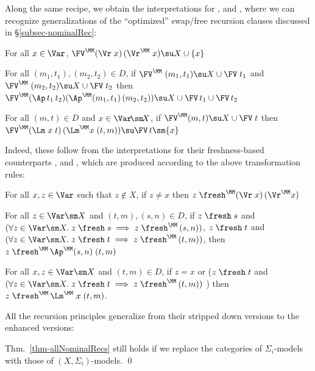 Along the same recipe, we obtain the interpretations for \FvVr{}, \FvAp{} and \FvLm{}, where we can recognize generalizations of the ``optimized'' swap/free recursion clauses discussed in  \S\ref{subsec-nominalRec}:
\begin{mmyitem}
\item  For all $x\in \Var$, 
$\FV^\MM(\Vr\;x)\,(\Vr^\MM\;x) \su X \cup \{x\}$
%
\item For all $(m_1,t_1),(m_2,t_2) \in D$, 
if $\FV^\MM\;(m_1,t_1) \su X \cup \FV\;t_1$ and $\FV^\MM\;(m_2,t_2) \su X \cup \FV\;t_2$ 
then 
\\
\hspace*{-2ex}$\FV^\MM(\Ap\,t_1\,t_2)(\Ap^\MM(m_1,t_1)\,(m_2,t_2)) \su X \cup \FV\,t_1 \cup \FV\,t_2$   

\item For all $(m,t)\in D$ and $x \in  \Var \!\sm\! X$, 
if $\FV^\MM(m,t) \su X \cup \FV\;t$ 
then 
$\FV^\MM(\Lm\;x\;t)\,(\Lm^\MM x\;(t,m)) \su \FV\,t \sm \{x\}$ 
\end{mmyitem}

Indeed, these follow from the interpretations for their freshness-based counterparts 
\FrVr{}, \FrAp{} and \FrLm{}, which are produced according to the above transformation rules:
\begin{mmyitem} 
\item For all $x,z\in\Var$ such that $z\notin X$, 
 if $z \not=x$ then $z\;\fresh^\MM(\Vr\;x)\,(\Vr^\MM x)$
%
\item For all $z\in\Var \sm X$ and $(t,m),(s,n) \in D$, 
if $z\;\fresh\;s$ and $(\forall z\in \Var \sm X.\; z\;\fresh\;s \implies z\;\fresh^\MM\,(s,n))$, 
$z\;\fresh\;t$ and $(\forall z\in \Var \sm X.\; z\;\fresh\;t \implies z\;\fresh^\MM\,(t,m))$, 
then 
$z\;\fresh^\MM\,\Ap^\MM(s,n)\;(t,m)$
%
\item For all $x,z\in\Var \sm X$ and $(t,m) \in D$, 
if $z = x$ or ($z\;\fresh\;t$ and $(\forall z\in \Var \sm X.\; z\;\fresh\;t \implies z\;\fresh^\MM\,(t,m))$ ) 
then $ z\;\fresh^\MM\,\Lm^\MM\;x\;(t,m)$. 
\end{mmyitem} 


All the recursion principles generalize from their stripped down versions 
to the enhanced versions: 

\medskip 
\begin{thm}\rm \label{thm-allNominalRecsEnhanced}
Thm.\ \ref{thm-allNominalRecs} still holds  if we replace 
the categories of $\Sigma_i$-models with those of $(X,\Sigma_i)$-models.  \qed
\end{thm} 
\medskip 

